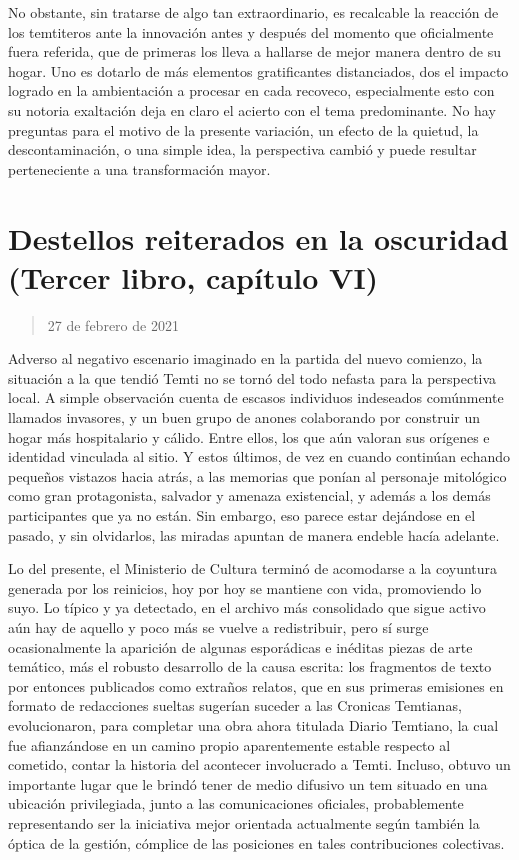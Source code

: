 \documentclass[
]{book}
\begin{document}
No obstante, sin tratarse de algo tan extraordinario, es recalcable la reacción de los temtiteros ante la innovación antes y después del momento que oficialmente fuera referida, que de primeras los lleva a hallarse de mejor manera dentro de su hogar. Uno es dotarlo de más elementos gratificantes distanciados, dos el impacto logrado en la ambientación a procesar en cada recoveco, especialmente esto con su notoria exaltación deja en claro el acierto con el tema predominante. No hay preguntas para el motivo de la presente variación, un efecto de la quietud, la descontaminación, o una simple idea, la perspectiva cambió y puede resultar perteneciente a una transformación mayor.

\hypertarget{destellos-reiterados-en-la-oscuridad-tercer-libro-capuxedtulo-vi}{%
\section{Destellos reiterados en la oscuridad (Tercer libro, capítulo VI)}\label{destellos-reiterados-en-la-oscuridad-tercer-libro-capuxedtulo-vi}}

\begin{quote}
27 de febrero de 2021
\end{quote}

Adverso al negativo escenario imaginado en la partida del nuevo comienzo, la situación a la que tendió Temti no se tornó del todo nefasta para la perspectiva local. A simple observación cuenta de escasos individuos indeseados comúnmente llamados invasores, y un buen grupo de anones colaborando por construir un hogar más hospitalario y cálido. Entre ellos, los que aún valoran sus orígenes e identidad vinculada al sitio. Y estos últimos, de vez en cuando continúan echando pequeños vistazos hacia atrás, a las memorias que ponían al personaje mitológico como gran protagonista, salvador y amenaza existencial, y además a los demás participantes que ya no están. Sin embargo, eso parece estar dejándose en el pasado, y sin olvidarlos, las miradas apuntan de manera endeble hacía adelante.

Lo del presente, el Ministerio de Cultura terminó de acomodarse a la coyuntura generada por los reinicios, hoy por hoy se mantiene con vida, promoviendo lo suyo. Lo típico y ya detectado, en el archivo más consolidado que sigue activo aún hay de aquello y poco más se vuelve a redistribuir, pero sí surge ocasionalmente la aparición de algunas esporádicas e inéditas piezas de arte temático, más el robusto desarrollo de la causa escrita: los fragmentos de texto por entonces publicados como extraños relatos, que en sus primeras emisiones en formato de redacciones sueltas sugerían suceder a las Cronicas Temtianas, evolucionaron, para completar una obra ahora titulada Diario Temtiano, la cual fue afianzándose en un camino propio aparentemente estable respecto al cometido, contar la historia del acontecer involucrado a Temti. Incluso, obtuvo un importante lugar que le brindó tener de medio difusivo un tem situado en una ubicación privilegiada, junto a las comunicaciones oficiales, probablemente representando ser la iniciativa mejor orientada actualmente según también la óptica de la gestión, cómplice de las posiciones en tales contribuciones colectivas.
\end{document}
